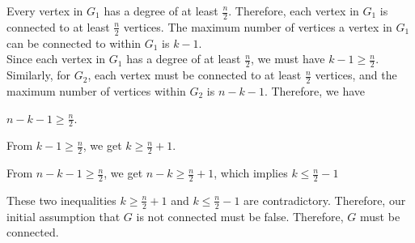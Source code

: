 \documentclass[solution,letterpaper]{cs20}
\begin{document}
\begin{problem}
\begin{solution}
        Every vertex in $ G_1 $ has a degree of at least $ \frac{n}{2}$.  Therefore, each vertex in $ G_1 $ is connected to at least $ \frac{n}{2} $ vertices. The maximum number of vertices a vertex in $ G_1 $ can be connected to within $ G_1 $ is $ k-1$. \\

        Since each vertex in $ G_1 $ has a degree of at least $ \frac{n}{2}$, we must have $k-1 \geq \frac{n}{2}$.
        Similarly, for $G_2$, each vertex must be connected to at least $ \frac{n}{2}$ vertices, and the maximum number of vertices within $ G_2 $ is $ n-k-1. $ Therefore, we have

        $n-k-1 \geq \frac{n}{2}$.

        From $ k-1 \geq \frac{n}{2}$, we get $ k \geq \frac{n}{2} + 1$.

        From $ n-k-1 \geq \frac{n}{2}$,  we get $ n-k \geq \frac{n}{2} + 1$, which implies $ k \leq \frac{n}{2} - 1$

        These two inequalities $ k \geq \frac{n}{2} + 1 $ and $ k \leq \frac{n}{2} - 1 $ are contradictory. Therefore, our initial assumption that $ G $ is not connected must be false.
        Therefore, $G$ must be connected.
        \end{solution}
    \end{problem}
    \newpage
\end{document}
